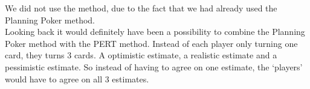 We did not use the method, due to the fact that we had already used the Planning Poker method.\\
Looking back it would definitely have been a possibility to combine the Planning Poker method with the PERT method. Instead of each player only turning one card, they turns 3 cards. A optimistic estimate, a realistic estimate and a pessimistic estimate. So instead of having to agree on one estimate, the `players' would have to agree on all 3 estimates.